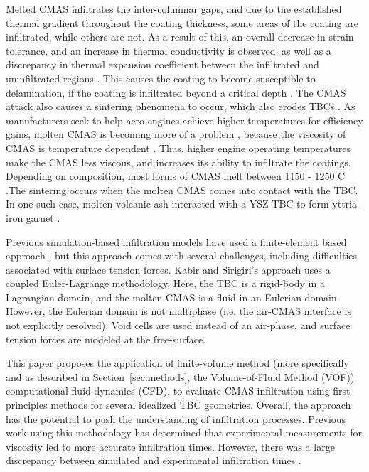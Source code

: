 \documentclass[%
 aip,
 amsmath,amssymb,
 reprint,%
floatfix]{revtex4-1}
\begin{document}
Melted CMAS infiltrates the inter-columnar gaps, and due to the established thermal gradient throughout the coating thickness, some areas of the coating are infiltrated, while others are not. As a result of this, an overall decrease in strain tolerance, and an increase in thermal conductivity is observed, as well as a discrepancy in thermal expansion coefficient between the infiltrated and uninfiltrated regions \cite{KAKUDA2015350,WU20111881, KRAMER200826}. This causes the coating to become susceptible to delamination, if the coating is infiltrated beyond a critical depth \cite{MERCER20051029}. The CMAS attack also causes a sintering phenomena to occur, which also erodes TBCs \cite{Peng2012}. As manufacturers seek to help aero-engines achieve higher temperatures for efficiency gains, molten CMAS is becoming more of a problem \cite{Boyce2012}, because the viscosity of CMAS is temperature dependent \cite{Naraparaju2017}. Thus, higher engine operating temperatures make the CMAS less viscous, and increases its ability to infiltrate the coatings. Depending on composition, most forms of CMAS melt between 1150 - 1250 \degree C \cite{Costa2019,Naraparaju2014,Wellman2010,Kramer2006}.The sintering occurs when the molten CMAS comes into contact with the TBC. In one such case, molten volcanic ash interacted with a YSZ TBC to form yttria-iron garnet \cite{Xia2019}.


Previous simulation-based infiltration models have used a finite-element based approach \cite{Kabir, Sirigiri2018}, but this approach comes with several challenges, including difficulties associated with surface tension forces. Kabir and Sirigiri's approach uses a coupled Euler-Lagrange methodology. Here, the TBC is a rigid-body in a Lagrangian domain, and the molten CMAS is a fluid in an Eulerian domain. However, the Eulerian domain is not multiphase (i.e. the air-CMAS interface is not explicitly resolved). Void cells are used instead of an air-phase, and surface tension forces are modeled at the free-surface.

This paper proposes the application of finite-volume method (more specifically and as described in Section~\ref{sec:methods}, the Volume-of-Fluid Method (VOF)) computational fluid dynamics (CFD), to evaluate CMAS infiltration using first principles methods for several idealized TBC geometries. 
Overall, the approach has the potential to push the understanding of infiltration processes. Previous work using this methodology has determined that experimental measurements for viscosity led to more accurate infiltration times. However, there was a large discrepancy between simulated and experimental infiltration times \cite{Cavainolo2023}. 
\end{document}

